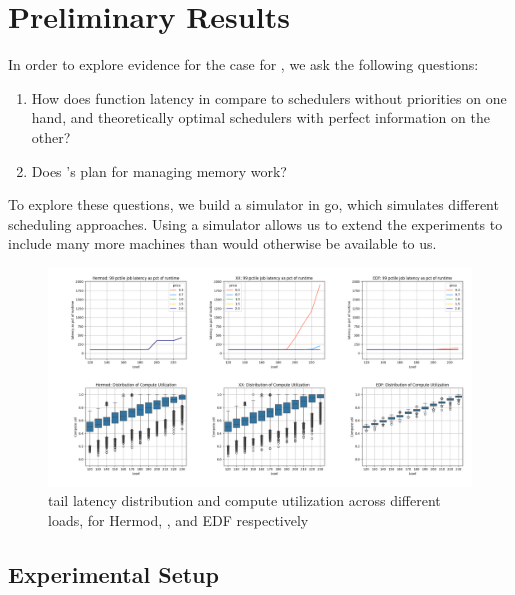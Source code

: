 \section{Preliminary Results}



In order to explore evidence for the case for \sys{}, we ask the following
questions: 
\begin{enumerate}
    \item How does function latency in \sys{} compare to schedulers without
    priorities on one hand, and theoretically optimal schedulers with perfect
    information on the other?
    \item Does \sys{}'s plan for managing memory work?
\end{enumerate}


To explore these questions, we build a simulator in go\cite{golang}, which
simulates different scheduling approaches. Using a simulator allows us to extend
the experiments to include many more machines than would otherwise be available
to us.

\begin{figure}[t!]
    \centering
      \includegraphics[width=16cm]{img/hermod_xx_edf_latencies.png}
      \caption{ tail latency distribution and compute utilization across
      different loads, for Hermod, \sys{}, and EDF respectively }
    \label{fig:hermod-xx-edf}
\end{figure}


\subsection{Experimental Setup}

